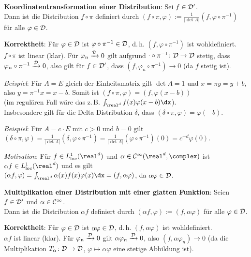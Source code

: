 \textbf{Koordinatentransformation einer Distribution}:
Sei $f \in \mathcal{D}'$.\\
Dann ist die Distribution $f \circ \pi$ definiert durch
$(f \circ \pi, \varphi) := \frac{1}{|\det A|} (f, \varphi \circ \pi^{-1})$
für alle $\varphi \in \mathcal{D}$.

\textbf{Korrektheit}:
Für $\varphi \in \mathcal{D}$ ist $\varphi \circ \pi^{-1} \in \mathcal{D}$, d.\,h.
$(f, \varphi \circ \pi^{-1})$ ist wohldefiniert.\\
$f \circ \pi$ ist linear (klar).
Für $\varphi_n \xrightarrow{\mathcal{D}} 0$ gilt aufgrund
$\cdot \circ \pi^{-1}\colon \mathcal{D} \rightarrow \mathcal{D}$ stetig, dass
$\varphi_n \circ \pi^{-1} \xrightarrow{\mathcal{D}} 0$,
also gilt für $f \in \mathcal{D}'$, dass $(f, \varphi_n \circ \pi^{-1}) \to 0$
(da $f$ stetig ist).

\emph{Beispiel}:
Für $A = E$ gleich der Einheitsmatrix gilt $\det A = 1$ und
$x = \pi y = y + b$, also $y = \pi^{-1} x = x - b$.
Somit ist $(f \circ \pi, \varphi) = (f, \varphi(x - b))$\\
(im regulären Fall wäre das z.\,B. $\int_{\real^d} f(x) \varphi(x - b) \dx$).\\
Insbesondere gilt für die Delta-Distribution $\delta$, dass
$(\delta \circ \pi, \varphi) = \varphi(-b)$.

\emph{Beispiel}:
Für $A = c \cdot E$ mit $c > 0$ und $b = 0$ gilt\\
$(\delta \circ \pi, \varphi) =
\frac{1}{|\det A|} (\delta, \varphi \circ \pi^{-1}) =
\frac{1}{|\det A|} (\varphi \circ \pi^{-1})(0) =
c^{-d} \varphi(0)$.

\linie

\emph{Motivation}:
Für $f \in L^1_\loc(\real^d)$ und $\alpha \in \C^\infty(\real^d, \complex)$
ist $\alpha f \in L^1_\loc(\real^d)$ und es gilt\\
$(\alpha f, \varphi) = \int_{\real^d} \alpha(x) f(x) \varphi(x) \dx =
(f, \alpha \varphi)$, da $\alpha \varphi \in \mathcal{D}$.

\textbf{Multiplikation einer Distribution mit einer glatten Funktion}:
Seien $f \in \mathcal{D}'$ und $\alpha \in \mathcal{C}^\infty$.\\
Dann ist die Distribution $\alpha f$ definiert durch
$(\alpha f, \varphi) := (f, \alpha \varphi)$ für alle $\varphi \in \mathcal{D}$.

\textbf{Korrektheit}:
Für $\varphi \in \mathcal{D}$ ist $\alpha \varphi \in \mathcal{D}$, d.\,h.
$(f, \alpha \varphi)$ ist wohldefiniert.\\
$\alpha f$ ist linear (klar).
Für $\varphi_n \xrightarrow{\mathcal{D}} 0$ gilt $\alpha \varphi_n \xrightarrow{\mathcal{D}} 0$,
also $(f, \alpha \varphi_n) \to 0$
(da die Multiplikation $T_\alpha\colon \mathcal{D} \rightarrow \mathcal{D}$,
$\varphi \mapsto \alpha \varphi$ eine stetige Abbildung ist).

